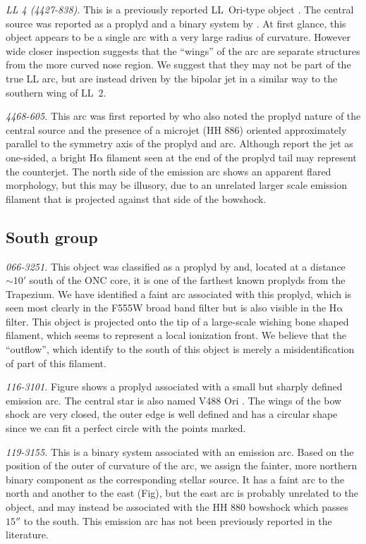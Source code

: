 \documentclass[iop, apj]{emulateapj}
\newcommand\ha{\ensuremath{\mathrm{H\alpha}}}
\begin{document}
\textit{LL 4 (4427-838).} This is a previously reported LL~Ori-type
object \citep{Bally:2001a}. The central source was reported as a
proplyd and a binary system by \citet{Bally:2006a}. At first glance,
this object appears to be a single arc with a very large radius of
curvature. However wide closer inspection suggests that the ``wings''
of the arc are separate structures from the more curved nose
region. We suggest that they may not be part of the true LL arc, but
are instead driven by the bipolar jet \citep{Bally:2006a} in a similar
way to the southern wing of LL~2.

\textit{4468-605.}  This arc was first reported by \citet{Bally:2006a}
who also noted the proplyd nature of the central source and the
presence of a microjet (HH 886) oriented approximately parallel to the
symmetry axis of the proplyd and arc.  Although \citet{Bally:2006a}
report the jet as one-sided, a bright \ha{} filament seen at the end
of the proplyd tail may represent the counterjet.  The north side of
the emission arc shows an apparent flared morphology, but this may be
illusory, due to an unrelated larger scale emission filament that is
projected against that side of the bowshock.

\subsection{South group}
\label{sec:s-group}

\textit{066-3251.} This object was classified as a proplyd by \citet{Ricci:2008a} and, located at a distance \(\sim 10'\) south of the ONC core, it is one of the farthest known proplyds from the Trapezium. We have identified a faint arc associated with this proplyd, which is seen most clearly in the F555W broad band filter but is also visible in the \ha{} filter. This object is projected onto the tip of a large-scale wishing bone shaped filament, which seems to represent a local ionization front. We believe that the ``outflow'', which \citet{Ricci:2008a} identify to the south of this object is merely a misidentification of part of this filament.  

\textit{116-3101.} Figure shows a proplyd associated with a small but sharply defined emission arc.  The central star is also named V488 Ori \citep{Bally:2006a}. The wings of the bow shock are very closed, the outer edge is well defined and has a circular shape since we can fit a perfect circle with the points marked.  

\textit{119-3155.} This is a binary system  associated with an emission arc. Based on the position of the outer of curvature of the arc, we assign the fainter, more northern binary component as the corresponding stellar source. It has a faint arc to the north and another to the east (Fig), but  the east arc is probably unrelated to the object, and may instead be associated with the HH 880 bowshock which passes \(15''\) to the south. This emission arc has not been previously reported in the literature.     
\end{document}

